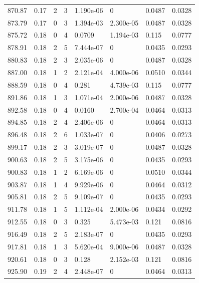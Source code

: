 \documentclass[preview]{standalone}
\begin{document}
{{{{{{{{{\begin{tabular}{L{1.2cm}C{1.2cm} C{0.3cm}C{0.5cm} C{1.4cm}C{1.4cm} C{1.4cm}C{1.4cm}}
  870.87  &  0.17  & 2     &  3 &  1.190e-06  & 0  & 0.0487 &  0.0328   \\ 
  873.79  &  0.17  & 0     &  3 &  1.394e-03  & 2.300e-05  & 0.0487 &  0.0328   \\ 
  875.72  &  0.18  & 0     &  4 &  0.0709  & 1.194e-03  & 0.115 &  0.0777   \\ 
  878.91  &  0.18  & 2     &  5 &  7.444e-07  & 0  & 0.0435 &  0.0293   \\ 
  880.83  &  0.18  & 2     &  3 &  2.035e-06  & 0  & 0.0487 &  0.0328   \\ 
  887.00  &  0.18  & 1     &  2 &  2.121e-04  & 4.000e-06  & 0.0510 &  0.0344   \\ 
  888.59  &  0.18  & 0     &  4 &  0.281  & 4.739e-03  & 0.115 &  0.0777   \\ 
  891.86  &  0.18  & 1     &  3 &  1.071e-04  & 2.000e-06  & 0.0487 &  0.0328   \\ 
  892.58  &  0.18  & 0     &  4 &  0.0160  & 2.700e-04  & 0.0464 &  0.0313   \\ 
  894.85  &  0.18  & 2     &  4 &  2.406e-06  & 0  & 0.0464 &  0.0313   \\ 
  896.48  &  0.18  & 2     &  6 &  1.033e-07  & 0  & 0.0406 &  0.0273   \\ 
  899.17  &  0.18  & 2     &  3 &  3.019e-07  & 0  & 0.0487 &  0.0328   \\ 
  900.63  &  0.18  & 2     &  5 &  3.175e-06  & 0  & 0.0435 &  0.0293   \\ 
  900.83  &  0.18  & 1     &  2 &  6.169e-06  & 0  & 0.0510 &  0.0344   \\ 
  903.87  &  0.18  & 1     &  4 &  9.929e-06  & 0  & 0.0464 &  0.0312   \\ 
  905.81  &  0.18  & 2     &  5 &  9.109e-07  & 0  & 0.0435 &  0.0293   \\ 
  911.78  &  0.18  & 1     &  5 &  1.112e-04  & 2.000e-06  & 0.0434 &  0.0292   \\ 
  912.55  &  0.18  & 0     &  3 &  0.325  & 5.473e-03  & 0.121 &  0.0816   \\ 
  916.49  &  0.18  & 2     &  5 &  2.183e-07  & 0  & 0.0435 &  0.0293   \\ 
  917.81  &  0.18  & 1     &  3 &  5.620e-04  & 9.000e-06  & 0.0487 &  0.0328   \\ 
  920.61  &  0.18  & 0     &  3 &  0.128  & 2.152e-03  & 0.121 &  0.0816   \\ 
  925.90  &  0.19  & 2     &  4 &  2.448e-07  & 0  & 0.0464 &  0.0313   \\ 

\end{tabular}}}}}}}}}}
\end{document}
